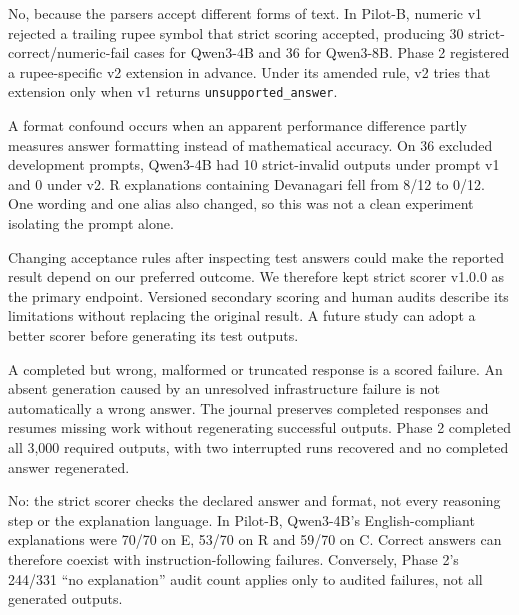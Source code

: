 No, because the parsers accept different forms of text. In Pilot-B, numeric v1 rejected a trailing rupee symbol that strict scoring accepted, producing 30 strict-correct/numeric-fail cases for Qwen3-4B and 36 for Qwen3-8B. Phase 2 registered a rupee-specific v2 extension in advance. Under its amended rule, v2 tries that extension only when v1 returns \texttt{unsupported\_answer}.

\medskip{}\par\nopagebreak

A format confound occurs when an apparent performance difference partly measures answer formatting instead of mathematical accuracy. On 36 excluded development prompts, Qwen3-4B had 10 strict-invalid outputs under prompt v1 and 0 under v2. R explanations containing Devanagari fell from 8/12 to 0/12. One wording and one alias also changed, so this was not a clean experiment isolating the prompt alone.

\medskip{}\par\nopagebreak

Changing acceptance rules after inspecting test answers could make the reported result depend on our preferred outcome. We therefore kept strict scorer v1.0.0 as the primary endpoint. Versioned secondary scoring and human audits describe its limitations without replacing the original result. A future study can adopt a better scorer before generating its test outputs.

\medskip{}\par\nopagebreak

A completed but wrong, malformed or truncated response is a scored failure. An absent generation caused by an unresolved infrastructure failure is not automatically a wrong answer. The journal preserves completed responses and resumes missing work without regenerating successful outputs. Phase 2 completed all 3,000 required outputs, with two interrupted runs recovered and no completed answer regenerated.

\medskip{}\par\nopagebreak

No: the strict scorer checks the declared answer and format, not every reasoning step or the explanation language. In Pilot-B, Qwen3-4B's English-compliant explanations were 70/70 on E, 53/70 on R and 59/70 on C. Correct answers can therefore coexist with instruction-following failures. Conversely, Phase 2's 244/331 “no explanation” audit count applies only to audited failures, not all generated outputs.

